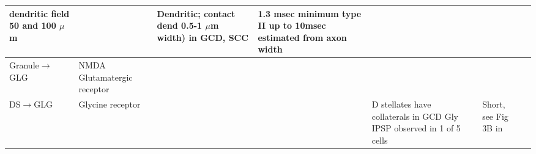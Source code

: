 \begin{longtable}{XXXXXXXX}
dendritic field 50 and 100 $\mu$m \citep{FerragamoGoldingEtAl:1998a}                     
&                                            
& %
Dendritic; contact dend 0.5-1 $\mu$m width) in GCD, SCC \citep{BensonBrown:2004}                
& %
1.3 msec minimum \citep{FerragamoGoldingEtAl:1998a} 
type II up to 10msec estimated from axon width \citep{Brown:1993}
\\ \midrule
Granule\ensuremath{\rightarrow}GLG                     
& NMDA  Glutamatergic receptor                 \citep{FerragamoGoldingEtAl:1998a}                     
& %
     \citep{GardnerTrussellEtAl:1999}      
& %
& %
& %
                   \citep{FerragamoGoldingEtAl:1998a}                     
& %
& %
\\ \midrule
DS\ensuremath{\rightarrow}GLG                                 
&                  
Glycine receptor                  
&  %
& 
& D stellates have collaterals in GCD \citep[mouse][]{OertelWuEtAl:1990}
Gly IPSP observed in 1 of 5 cells \citep{FerragamoGoldingEtAl:1998}    
&                                            
& %
Short, see Fig 3B in \citep{FerragamoGoldingEtAl:1998}\\ \midrule


\end{longtable}
